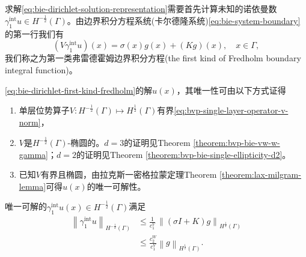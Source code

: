 求解\eqref{eq:bie-dirichlet-solution-representation}需要首先计算未知的诺依曼数$\gamma_{1}^{\text{int}}u \in H^{-\frac{1}{2}}(\Gamma)$。由边界积分方程系统(卡尔德隆系统)\eqref{eq:bie-system-boundary}的第一行我们有
\begin{equation}
  \label{eq:bie-dirichlet-first-kind-fredholm}
  \left( V \gamma_{1}^{\text{int}} u \right)(x)
  = \sigma(x) g(x) + \left( K g \right)(x), \quad x \in \Gamma,
\end{equation}
我们称之为第一类弗雷德霍姆边界积分方程(the first kind of Fredholm boundary integral function)\citep{Atkinson:1996vm, Atkinson:1997vx}。

\eqref{eq:bie-dirichlet-first-kind-fredholm}的解$u(x)$，其唯一性可由以下方式证得
\begin{enumerate}
  \item 单层位势算子$V:H^{-\frac{1}{2}}(\Gamma) \mapsto H^{\frac{1}{2}}(\Gamma)$有界\eqref{eq:bvp-single-layer-operator-v-norm}，
  \item $V$是$H^{-\frac{1}{2}}(\Gamma)$-椭圆的。$d=3$的证明见Theorem \ref{theorem:bvp-bie-vw-w-gamma}；$d=2$的证明见Theorem \ref{theorem:bvp-bie-single-ellipticity-d2}。
  \item 已知$V$有界且椭圆，由拉克斯一密格拉蒙定理Theorem \ref{theorem:lax-milgram-lemma}可得$u(x)$的唯一可解性。
\end{enumerate}

唯一可解的$\gamma_{1}^{\text{int}} u(x) \in H^{-\frac{1}{2}}(\Gamma)$满足
\begin{equation*}
\begin{split}
  \left\| \gamma_{1}^{\text{int}} u \right\|_{H^{-\frac{1}{2}}(\Gamma)}
  & \le \frac{1}{c_{1}^{V}} \,
  \left\| \left( \sigma I + K \right) g \right\|_{H^{\frac{1}{2}}(\Gamma)} \\
  & \le \frac{c_{2}^{W}}{c_{1}^{V}}
  \left\| g \right\|_{H^{\frac{1}{2}}(\Gamma)}.
\end{split}
\end{equation*}

